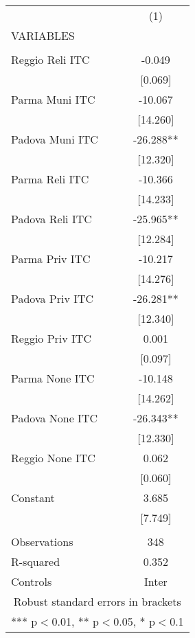 \begin{tabular}{lc} \hline
 & (1) \\
VARIABLES &  \\ \hline
 &  \\
Reggio Reli ITC & -0.049 \\
 & [0.069] \\
Parma Muni ITC & -10.067 \\
 & [14.260] \\
Padova Muni ITC & -26.288** \\
 & [12.320] \\
Parma Reli ITC & -10.366 \\
 & [14.233] \\
Padova Reli ITC & -25.965** \\
 & [12.284] \\
Parma Priv ITC & -10.217 \\
 & [14.276] \\
Padova Priv ITC & -26.281** \\
 & [12.340] \\
Reggio Priv ITC & 0.001 \\
 & [0.097] \\
Parma None ITC & -10.148 \\
 & [14.262] \\
Padova None ITC & -26.343** \\
 & [12.330] \\
Reggio None ITC & 0.062 \\
 & [0.060] \\
Constant & 3.685 \\
 & [7.749] \\
 &  \\
Observations & 348 \\
R-squared & 0.352 \\
 Controls & Inter \\ \hline
\multicolumn{2}{c}{ Robust standard errors in brackets} \\
\multicolumn{2}{c}{ *** p$<$0.01, ** p$<$0.05, * p$<$0.1} \\
\end{tabular}
